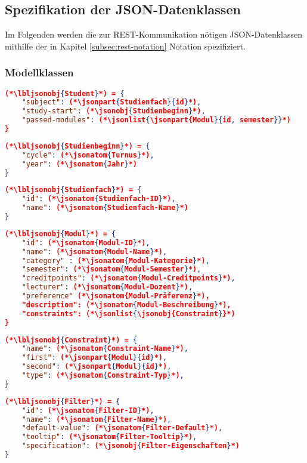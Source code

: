 \FloatBarrier
\subsection{Spezifikation der JSON-Datenklassen}

Im Folgenden werden die zur REST-Kommunikation nötigen JSON-Datenklassen mithilfe der in Kapitel \ref{subsec:rest-notation} Notation spezifiziert. 

\subsubsection*{Modellklassen}

\begin{lstlisting}[language=json]
(*\lbljsonobj{Student}*) = {
	"subject": (*\jsonpart{Studienfach}{id}*),
	"study-start": (*\jsonobj{Studienbeginn}*),
	"passed-modules": (*\jsonlist{\jsonpart{Modul}{id, semester}}*)
}
\end{lstlisting}

\begin{lstlisting}[language=json]
(*\lbljsonobj{Studienbeginn}*) = {
	"cycle": (*\jsonatom{Turnus}*),
	"year": (*\jsonatom{Jahr}*)
}
\end{lstlisting}

\begin{lstlisting}[language=json]	
(*\lbljsonobj{Studienfach}*) = {
	"id": (*\jsonatom{Studienfach-ID}*),
	"name": (*\jsonatom{Studienfach-Name}*)
}
\end{lstlisting}


\begin{lstlisting}[language=json]
(*\lbljsonobj{Modul}*) = {
	"id": (*\jsonatom{Modul-ID}*),
	"name": (*\jsonatom{Modul-Name}*),
	"category" : (*\jsonatom{Modul-Kategorie}*),
	"semester": (*\jsonatom{Modul-Semester}*),
	"creditpoints": (*\jsonatom{Modul-Creditpoints}*),
	"lecturer": (*\jsonatom{Modul-Dozent}*),
	"preference" (*\jsonatom{Modul-Präferenz}*),
	"description": (*\jsonatom{Modul-Beschreibung}*),	
	"constraints": (*\jsonlist{\jsonobj{Constraint}}*)
}
\end{lstlisting}

\begin{lstlisting}[language=json]
(*\lbljsonobj{Constraint}*) = {
	"name": (*\jsonatom{Constraint-Name}*),
	"first": (*\jsonpart{Modul}{id}*),
	"second": (*\jsonpart{Modul}{id}*),
	"type": (*\jsonatom{Constraint-Typ}*),
}
\end{lstlisting}

\begin{lstlisting}[language=json]
(*\lbljsonobj{Filter}*) = {
	"id": (*\jsonatom{Filter-ID}*),
	"name": (*\jsonatom{Filter-Name}*),
	"default-value": (*\jsonatom{Filter-Default}*),
	"tooltip": (*\jsonatom{Filter-Tooltip}*),
	"specification": (*\jsonobj{Filter-Eigenschaften}*)
}
\end{lstlisting}

